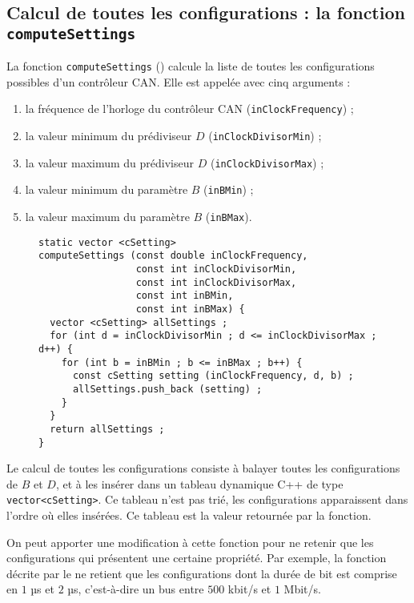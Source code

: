 \subsection{Calcul de toutes les configurations : la fonction \texttt{computeSettings}}

La fonction \texttt{computeSettings} () calcule la liste de toutes les configurations possibles d'un contrôleur CAN. Elle est appelée avec cinq arguments :
\begin{enumerate}
  \item la fréquence de l'horloge du contrôleur CAN (\texttt{inClockFrequency}) ;
  \item la valeur minimum du prédiviseur $D$ (\texttt{inClockDivisorMin}) ;
  \item la valeur maximum du prédiviseur $D$ (\texttt{inClockDivisorMax}) ;
  \item la valeur minimum du paramètre $B$ (\texttt{inBMin}) ;
  \item la valeur maximum du paramètre $B$ (\texttt{inBMax}).
\end{enumerate}



\begin{figure}[!ht]
\begin{lstlisting}
static vector <cSetting>
computeSettings (const double inClockFrequency,
                 const int inClockDivisorMin,
                 const int inClockDivisorMax,
                 const int inBMin,
                 const int inBMax) {
  vector <cSetting> allSettings ;
  for (int d = inClockDivisorMin ; d <= inClockDivisorMax ; d++) {
    for (int b = inBMin ; b <= inBMax ; b++) {
      const cSetting setting (inClockFrequency, d, b) ;
      allSettings.push_back (setting) ;
    }
  }
  return allSettings ;
}
\end{lstlisting}
\end{figure}


Le calcul de toutes les configurations consiste à balayer toutes les configurations de $B$ et $D$, et à les insérer dans un tableau dynamique C++ de type \texttt{vector<cSetting>}. Ce tableau n'est pas trié, les configurations apparaissent dans l'ordre où elles insérées. Ce tableau est la valeur retournée par la fonction.

On peut apporter une modification à cette fonction pour ne retenir que les configurations qui présentent une certaine propriété. Par exemple, la fonction décrite par le  ne retient que les configurations dont la durée de bit est comprise en $1$ µs et $2$ µs, c'est-à-dire un bus entre $500$ kbit/s et $1$ Mbit/s.




